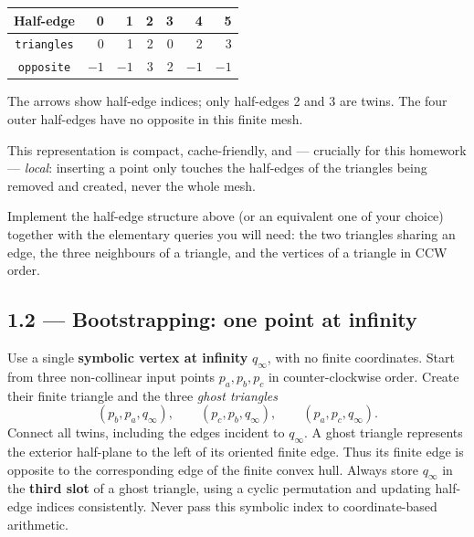\documentclass[11pt,a4paper]{article}
\begin{document}
\begin{center}
\qquad
\begin{tabular}{c|rrr|rrr}
\toprule
Half-edge & 0 & 1 & 2 & 3 & 4 & 5 \\
\midrule
\texttt{triangles} & 0 & 1 & 2 & 0 & 2 & 3 \\
\texttt{opposite} & $-1$ & $-1$ & 3 & 2 & $-1$ & $-1$ \\
\bottomrule
\end{tabular}
\end{center}
The arrows show half-edge indices; only half-edges 2 and 3 are twins.
The four outer half-edges have no opposite in this finite mesh.

This representation is compact, cache-friendly, and --- crucially for this
homework --- \emph{local}: inserting a point only touches the half-edges of
the triangles being removed and created, never the whole mesh.

\begin{task}\label{tsk:halfedge}
Implement the half-edge structure above (or an equivalent one of your
choice) together with the elementary queries you will need: the two
triangles sharing an edge, the three neighbours of a triangle, and the
vertices of a triangle in CCW order.
\end{task}

\subsection*{1.2 --- Bootstrapping: one point at infinity}

Use a single \textbf{symbolic vertex at infinity} $q_\infty$, with no finite
coordinates. Start from three non-collinear input points $p_a,p_b,p_c$ in
counter-clockwise order. Create their finite triangle and the three
\emph{ghost triangles}
\[
 (p_b,p_a,q_\infty),\qquad (p_c,p_b,q_\infty),\qquad
 (p_a,p_c,q_\infty).
\]
Connect all twins, including the edges incident to $q_\infty$. A ghost
triangle represents the exterior half-plane to the left of its oriented
finite edge. Thus its finite edge is opposite to the corresponding edge
of the finite convex hull. Always store $q_\infty$ in the \textbf{third slot}
of a ghost triangle, using a cyclic permutation and updating half-edge
indices consistently. Never pass this symbolic index to coordinate-based
arithmetic.
\end{document}
